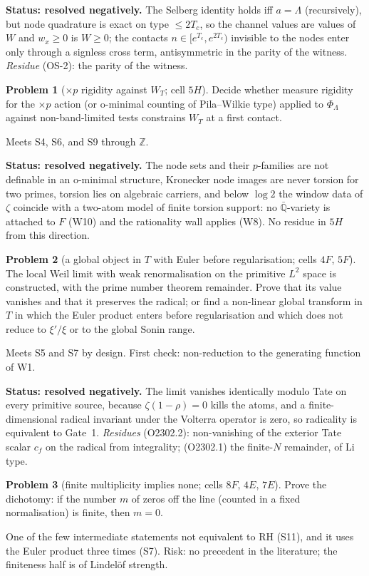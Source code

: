 \documentclass[11pt]{amsart}
\theoremstyle{definition}
\newtheorem{problem}{Problem}
\theoremstyle{remark}
\newcommand{\Z}{\mathbb Z}
\begin{document}
\noindent\textbf{Status: resolved negatively.} The Selberg identity holds iff $a=\Lambda$ (recursively), but node
quadrature is exact on type $\le2T_c$, so the channel values are values of $W$ and $w_x\ge0$ is $W\ge0$; the
contacts $n\in[e^{T_c},e^{2T_c})$ invisible to the nodes enter only through a signless cross term, antisymmetric
in the parity of the witness. \emph{Residue} (OS-2): the parity of the witness.

\begin{problem}[$\times p$ rigidity against $W_T$; cell $5H$]\label{prob:3}
Decide whether measure rigidity for the $\times p$ action (or o-minimal counting of Pila--Wilkie type)
applied to $\Phi_\Lambda$ against non-band-limited tests constrains $W_T$ at a first contact.
\end{problem}
\noindent Meets S4, S6, and S9 through $\Z$.

\noindent\textbf{Status: resolved negatively.} The node sets and their $p$-families are not definable in an
o-minimal structure, Kronecker node images are never torsion for two primes, torsion lies on algebraic carriers,
and below $\log2$ the window data of $\zeta$ coincide with a two-atom model of finite torsion support: no
$\bar{\mathbb Q}$-variety is attached to $F$ (W10) and the rationality wall applies (W8). No residue in $5H$
from this direction.

\begin{problem}[a global object in $T$ with Euler before regularisation; cells $4F$, $5F$]\label{prob:4}
The local Weil limit with weak renormalisation on the primitive $L^2$ space is constructed, with the prime
number theorem remainder. Prove that its value vanishes and that it preserves the radical; or find a
non-linear global transform in $T$ in which the Euler product enters before regularisation and which does not
reduce to $\xi'/\xi$ or to the global Sonin range.
\end{problem}
\noindent Meets S5 and S7 by design. First check: non-reduction to the generating function of W1.

\noindent\textbf{Status: resolved negatively.} The limit vanishes identically modulo Tate on every primitive source,
because $\zeta(1-\rho)=0$ kills the atoms, and a finite-dimensional radical invariant under the Volterra operator is
zero, so radicality is equivalent to Gate~1. \emph{Residues} (O2302.2): non-vanishing of the exterior Tate scalar
$c_f$ on the radical from integrality; (O2302.1) the finite-$N$ remainder, of Li type.

\begin{problem}[finite multiplicity implies none; cells $8F$, $4E$, $7E$]\label{prob:5}
Prove the dichotomy: if the number $m$ of zeros off the line (counted in a fixed normalisation) is finite,
then $m=0$.
\end{problem}
\noindent One of the few intermediate statements not equivalent to RH (S11), and it uses the Euler product
three times (S7). Risk: no precedent in the literature; the finiteness half is of Lindelöf strength.
\end{document}
